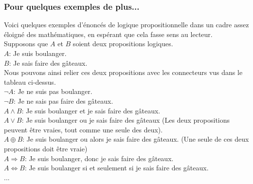 \documentclass[a4paper, 12pt]{article}
\newcommand{\ffi}{\Leftrightarrow}
\newcommand{\imply}{\Rightarrow}
\numberwithin{equation}{subsection}
\begin{document}
    \subsubsection{Pour quelques exemples de plus...}
        Voici quelques exemples d'énoncés de logique propositionnelle dans un cadre assez éloigné des mathématiques, en espérant que cela fasse sens au lecteur.\\
        Supposons que $A$ et $B$ soient deux propositions logiques. \\
        $A$: Je suis boulanger. \\
        $B$: Je sais faire des gâteaux. \\
        Nous pouvons ainsi relier ces deux propositions avec les connecteurs vus dans le tableau ci-dessus. \\
        $\neg A$: Je ne suis pas boulanger. \\
        $\neg B$: Je ne sais pas faire des gâteaux. \\
        $A \land B$: Je suis boulanger et je sais faire des gâteaux. \\
        $A \lor B$: Je suis boulanger ou je sais faire des gâteaux (Les deux propositions peuvent être vraies, tout comme une seule des deux). \\
        $A \oplus B$: Je suis boulanger ou alors je sais faire des gâteaux. (Une seule de ces deux propositions doit être vraie) \\
        $A \imply B$: Je suis boulanger, donc je sais faire des gâteaux. \\
        $A \ffi B$: Je suis boulanger si et seulement si je sais faire des gâteaux. \\
        ... \\
\end{document}
